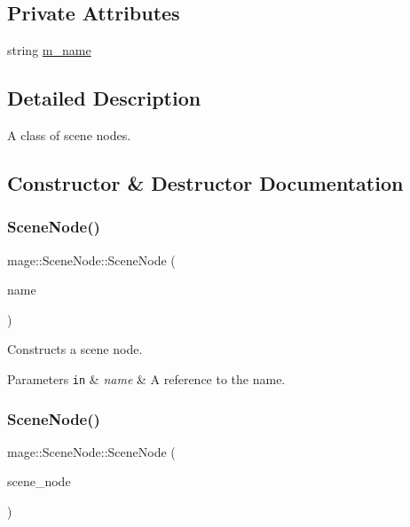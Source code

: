 \subsection*{Private Attributes}
\begin{DoxyCompactItemize}
\item 
string \hyperlink{classmage_1_1_scene_node_a3ba13ec190df3e020c89d2ace0301dec}{m\+\_\+name}
\end{DoxyCompactItemize}


\subsection{Detailed Description}
A class of scene nodes. 

\subsection{Constructor \& Destructor Documentation}
\hypertarget{classmage_1_1_scene_node_afc138707692a66952484ae2b3c6e15d5}{}\label{classmage_1_1_scene_node_afc138707692a66952484ae2b3c6e15d5} 
\subsubsection{\texorpdfstring{Scene\+Node()}{SceneNode()}\hspace{0.1cm}{\footnotesize\ttfamily [1/3]}}
{\footnotesize\ttfamily mage\+::\+Scene\+Node\+::\+Scene\+Node (\begin{DoxyParamCaption}\item[{const string \&}]{name }\end{DoxyParamCaption})\hspace{0.3cm}{\ttfamily [explicit]}}

Constructs a scene node.


\begin{DoxyParams}[1]{Parameters}
\mbox{\tt in}  & {\em name} & A reference to the name. \\
\hline
\end{DoxyParams}
\hypertarget{classmage_1_1_scene_node_a0259a6b573eb633b589cd986b9ec6734}{}\label{classmage_1_1_scene_node_a0259a6b573eb633b589cd986b9ec6734} 
\subsubsection{\texorpdfstring{Scene\+Node()}{SceneNode()}\hspace{0.1cm}{\footnotesize\ttfamily [2/3]}}
{\footnotesize\ttfamily mage\+::\+Scene\+Node\+::\+Scene\+Node (\begin{DoxyParamCaption}\item[{const \hyperlink{classmage_1_1_scene_node}{Scene\+Node} \&}]{scene\+\_\+node }\end{DoxyParamCaption})\hspace{0.3cm}{\ttfamily [default]}}

